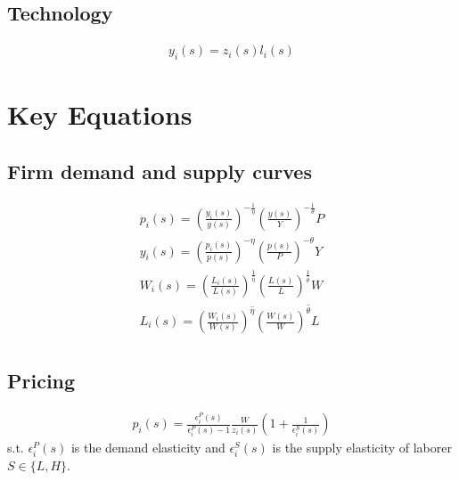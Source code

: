 \subsection{Technology}


\begin{align}
    y_i(s) = z_i(s) l_i(s)
\end{align}

\section{Key Equations}

\subsection{Firm demand and supply curves}

\begin{align}
p_i(s) = (\frac{y_i(s)}{y(s)})^{-\frac{1}{\eta}}(\frac{y(s)}{Y})^{-\frac{1}{\theta}}P\\
y_i(s) = (\frac{p_i(s)}{p(s)})^{-\eta}(\frac{p(s)}{P})^{-\theta}Y\\
    W_i(s) = (\frac{L_i(s)}{L(s)})^{\frac{1}{\hat{\eta}}}(\frac{L(s)}{L})^{\frac{1}{\hat{\theta}}} W\\
    L_i(s) = (\frac{W_i(s)}{W(s)})^{\hat{\eta}}(\frac{W(s)}{W})^{\hat{\theta}} L\\
\end{align}

\subsection{Pricing}

\begin{align}
    p_i(s) = \frac{\epsilon_i^P(s)}{\epsilon_i^P(s)-1} \frac{W }{z_i(s)}(1+\frac{1}{\epsilon_i^S(s)})
\end{align}
s.t. $\epsilon_i^P(s)$ is the demand elasticity and $\epsilon_i^S(s)$ is the supply elasticity of laborer $S \in \{L,H\}$.\\

